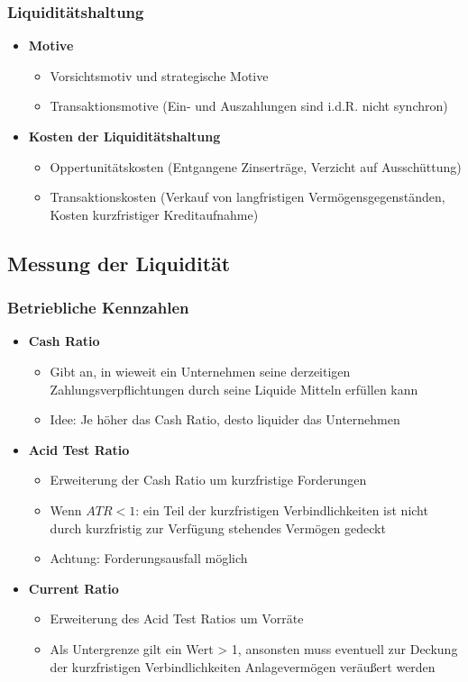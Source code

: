 \subsubsection{Liquiditätshaltung}
\begin{itemize}
	\item \textbf{Motive}
	\begin{itemize}
		\item Vorsichtsmotiv und strategische Motive
		\item Transaktionsmotive (Ein- und Auszahlungen sind i.d.R. nicht synchron)
	\end{itemize}
	\item \textbf{Kosten der Liquiditätshaltung}
	\begin{itemize}
		\item Oppertunitätskosten (Entgangene Zinserträge, Verzicht auf Ausschüttung)
		\item Transaktionskosten (Verkauf von langfristigen Vermögensgegenständen, Kosten kurzfristiger Kreditaufnahme)
	\end{itemize}
\end{itemize}


\subsection{Messung der Liquidität}

\subsubsection{Betriebliche Kennzahlen}
\begin{itemize}
	\item \textbf{Cash Ratio}
	\begin{itemize}
		\item Gibt an, in wieweit ein Unternehmen seine derzeitigen Zahlungsverpflichtungen durch seine Liquide Mitteln erfüllen kann
		\item Idee: Je höher das Cash Ratio, desto liquider das Unternehmen
	\end{itemize}
	\item \textbf{Acid Test Ratio}
	\begin{itemize}
		\item Erweiterung der Cash Ratio um kurzfristige Forderungen
		\item Wenn \(ATR < 1\): ein Teil der kurzfristigen Verbindlichkeiten ist nicht durch kurzfristig zur Verfügung stehendes Vermögen gedeckt
		\item Achtung: Forderungsausfall möglich
	\end{itemize}
	\item \textbf{Current Ratio}
	\begin{itemize}
		\item Erweiterung des Acid Test Ratios um Vorräte
		\item Als Untergrenze gilt ein Wert > 1, ansonsten muss eventuell zur Deckung der kurzfristigen Verbindlichkeiten Anlagevermögen veräußert werden
	\end{itemize}
\end{itemize}


